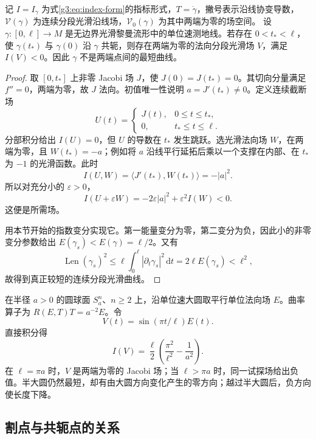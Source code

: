 \begin{proposition}\label{g3:prop:interior-conjugate-negative}
	记 \(I=I_\gamma\) 为式\eqref{g3:eq:index-form}的指标形式，\(T=\dot\gamma\)，撇号表示沿线协变导数，\(\mathcal V(\gamma)\) 为连续分段光滑沿线场，\(\mathcal V_0(\gamma)\) 为其中两端为零的场空间。
	设 \(\gamma:[0,\ell]\to M\) 是无边界光滑黎曼流形中的单位速测地线。若存在 \(0<t_*<\ell\)，使 \(\gamma(t_*)\) 与 \(\gamma(0)\) 沿 \(\gamma\) 共轭，则存在两端为零的法向分段光滑场 \(V\)，满足 \(I(V)<0\)。因此 \(\gamma\) 不是两端点间的最短曲线。
\end{proposition}
\begin{proof}
	取 \([0,t_*]\) 上非零 Jacobi 场 \(J\)，使 \(J(0)=J(t_*)=0\)。其切向分量满足 \(f''=0\)，两端为零，故 \(J\) 法向。初值唯一性说明 \(a=J'(t_*)\ne0\)。定义连续截断场
	\[
		U(t)=
		\begin{cases}
			J(t),&0\le t\le t_*,\\
			0,&t_*\le t\le\ell.
		\end{cases}
	\]
	分部积分给出 \(I(U)=0\)，但 \(U\) 的导数在 \(t_*\) 发生跳跃。选光滑法向场 \(W\)，在两端为零，且 \(W(t_*)=-a\)；例如将 \(a\) 沿线平行延拓后乘以一个支撑在内部、在 \(t_*\) 为 \(-1\) 的光滑函数。此时
	\[
		I(U,W)=\langle J'(t_*),W(t_*)\rangle=-|a|^2.
	\]
	所以对充分小的 \(\varepsilon>0\)，
	\[
		I(U+\varepsilon W)
		=-2\varepsilon|a|^2+\varepsilon^2I(W)<0.
	\]
	这便是所需场。

	用本节开始的指数变分实现它。第一能量变分为零，第二变分为负，因此小的非零变分参数给出 \(E(\gamma_s)<E(\gamma)=\ell/2\)。又有
	\[
		\operatorname{Len}(\gamma_s)^2
		\le \ell\int_0^\ell|\partial_t\gamma_s|^2\,\mathrm dt
		=2\ell E(\gamma_s)<\ell^2,
	\]
	故得到真正较短的连续分段光滑曲线。
\end{proof}

\begin{example}\label{g3:exm:sphere-index-sign}
	在半径 \(a>0\) 的圆球面 \(S_a^n\)、\(n\ge2\) 上，沿单位速大圆取平行单位法向场 \(E\)。曲率算子为 \(R(E,T)T=a^{-2}E\)。令
	\[
		V(t)=\sin(\pi t/\ell)E(t).
	\]
	直接积分得
	\[
		I(V)=\frac{\ell}{2}
		\left(\frac{\pi^2}{\ell^2}-\frac1{a^2}\right).
	\]
	在 \(\ell=\pi a\) 时，\(V\) 是两端为零的 Jacobi 场；当 \(\ell>\pi a\) 时，同一试探场给出负值。半大圆仍然最短，却有由大圆方向变化产生的零方向；越过半大圆后，负方向使长度下降。
\end{example}

\subsection{割点与共轭点的关系}
\label{g3:subsec:0603:04}

